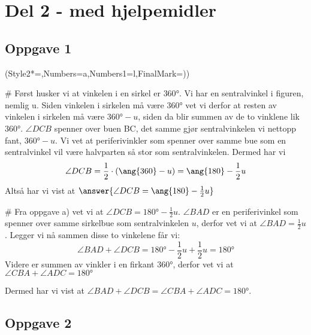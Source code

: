 \section*{Del 2 - med hjelpemidler}

\subsection*{Oppgave 1}
\begin{easylist}[enumerate]
	\ListProperties(Style2*=,Numbers=a,Numbers1=l,FinalMark={)})
	
	# Først husker vi at vinkelen i en sirkel er $\ang{360}$. 
	Vi har en sentralvinkel i figuren, nemlig u. Siden vinkelen i sirkelen må være $\ang{360}$ vet vi derfor at resten av vinkelen i sirkelen må være $\ang{360} - u$, siden da blir summen av de to vinklene lik $\ang{360}$. 
	$\angle DCB$ spenner over buen BC, det samme gjør sentralvinkelen vi nettopp fant, $\ang{360} - u$. 
	Vi vet at periferivinkler som spenner over samme bue som en sentralvinkel vil være halvparten så stor som sentralvinkelen. 
	Dermed har vi 
	\begin{equation*}
		\angle DCB = \frac{1}{2} \cdot (\ang{360} - u) \\ = \ang{180} - \frac{1}{2}u
	\end{equation*}
	Altså har vi vist at $\answer{\angle DCB = \ang{180} - \frac{1}{2}u}$
	
	# Fra oppgave a) vet vi at $\angle DCB = \ang{180} - \frac{1}{2}u$. $\angle BAD$ er en periferivinkel som spenner over samme sirkelbue som sentralvinkelen $u$, derfor vet vi at  $\angle BAD = \frac{1}{2}u$. Legger vi nå sammen disse to vinkelene får vi:
	\begin{equation*}
		\angle BAD + \angle DCB = \ang{180} - \frac{1}{2}u + \frac{1}{2}u = \ang{180}
	\end{equation*}
	Videre er summen av vinkler i en firkant $\ang{360}$, derfor vet vi at $\angle CBA + \angle ADC = \ang{180}$
	
	Dermed har vi vist at $\angle BAD + \angle DCB = \angle CBA + \angle ADC = \ang{180}$.
	
	
\end{easylist}
\subsection*{Oppgave 2}

